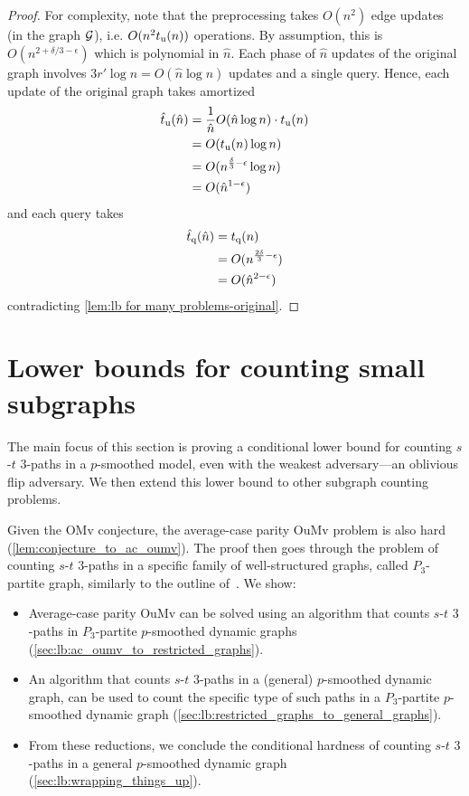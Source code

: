 \documentclass[letter,11pt]{article}
\newcommand{\omv}{\textnormal{\textsf{OMv}}\xspace}
\newcommand{\oumv}{\textnormal{\textsf{OuMv}}\xspace}
\newcommand{\paths}[3]{${#1}$-${#2}$ ${#3}$-paths\xspace}
\newcommand{\tu}{t_{\textnormal{u}}}
\newcommand{\tq}{t_{\textnormal{q}}}
\begin{document}
\begin{proof}
	For complexity, 
	note that the preprocessing takes $O(n^2)$ edge updates (in the graph $\cal G$),
	i.e. $O(n^2\tu(n))$ operations.
	By assumption, this is
	$O(n^{2+\delta/3-\epsilon})$
	which is polynomial in $\hat n$.
	Each phase of $\hat n$ updates of the original graph involves $3r'\log n=O(\hat n \log n)$ updates and a single query.
	Hence, each update of the original graph takes amortized 
	\[
		\begin{split}
			\hat\tu(\hat n)
			&=\frac{1}{\hat n}O(\hat n \log n)\cdot \tu(n)\\
			&=O(\tu(n)\log n)\\
			&=O(n^{\frac{\delta}{3}-\epsilon}\log n)\\
			&=O(\hat n^{1-\epsilon})
		\end{split}
	\]
	and each query takes 
	\[
		\begin{split}
			\hat\tq(\hat n)
			&=\tq(n)\\
			&=O(n^{\frac{2\delta}{3}-\epsilon})\\
			&=O(\hat n^{2-\epsilon})
		\end{split}
	\]   
	contradicting \cref{lem:lb for many problems-original}.
\end{proof}

\section{Lower bounds for counting small subgraphs}
\label{sec:lb small subgraphs}
The main focus of this section is proving a conditional lower bound for counting \paths{s}{t}{3} in a $p$-smoothed model, even with the weakest adversary---an oblivious flip adversary. 
We then extend this lower bound to other subgraph counting problems.

Given the \omv conjecture, the average-case parity \oumv problem is also hard (\cref{lem:conjecture_to_ac_oumv}).
The proof then goes through the problem of counting \paths{s}{t}{3} in a specific family of well-structured graphs, called $P_3$-partite graph, similarly to the outline of~\cite{HLS22}.
We show:
\begin{itemize}
    \item Average-case parity \oumv can be solved using an algorithm that counts \paths{s}{t}{3} in $P_3$-partite $p$-smoothed dynamic graphs (\cref{sec:lb:ac_oumv_to_restricted_graphs}).

    \item An algorithm that counts \paths{s}{t}{3} in a (general) $p$-smoothed dynamic graph, can be used to count the specific type of such paths in a $P_3$-partite $p$-smoothed dynamic graph (\cref{sec:lb:restricted_graphs_to_general_graphs}).
    
    \item From these reductions, we conclude the conditional hardness of counting 
    \paths{s}{t}{3} in a general $p$-smoothed dynamic graph (\cref{sec:lb:wrapping_things_up}).    
\end{itemize}
\end{document}
